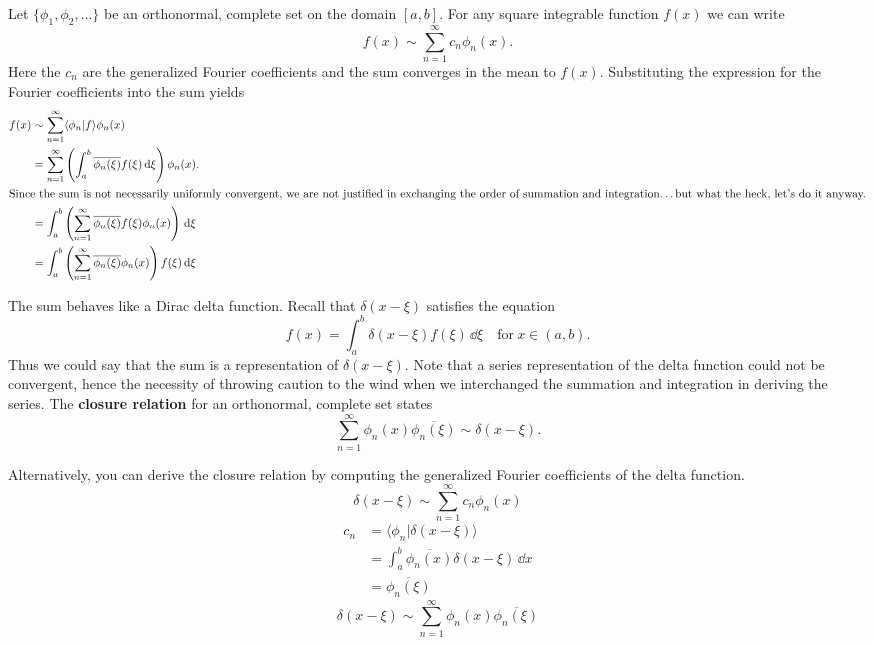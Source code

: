 Let $\{ \phi_1, \phi_2, \ldots \}$ be an orthonormal, complete set on the
domain $[a,b]$.  For any
square integrable function $f(x)$ we can write
\[ f(x) \sim \sum_{n = 1}^\infty c_n \phi_n(x).\]
Here the $c_n$ are the generalized Fourier coefficients and the sum converges
in the mean to $f(x)$.  Substituting the expression for the Fourier
coefficients into the sum yields
\begin{align*}
  f(x) &\sim \sum_{n = 1}^\infty \langle \phi_n | f \rangle \phi_n(x) \\
  &= \sum_{n = 1}^\infty \left( \int_a^b \overline{\phi_n(\xi)} f(\xi)\,\mathrm{d} \xi 
  \right) \phi_n(x). \\
  \intertext{Since the sum is not necessarily uniformly convergent, we are
    not justified in exchanging the order of summation and integration\ldots but
    what the heck, let's do it anyway.}
  &= \int_a^b \left(\sum_{n = 1}^\infty \overline{\phi_n(\xi)} f(\xi) \phi_n(x) 
  \right)\,\mathrm{d} \xi \\
  &= \int_a^b \left(\sum_{n = 1}^\infty \overline{\phi_n(\xi)} \phi_n(x) \right)
  f(\xi)\,\mathrm{d} \xi
\end{align*}

The sum behaves like a Dirac delta function.  
Recall that $\delta(x-\xi)$ satisfies the equation
\[ f(x) = \int_a^b \delta(x-\xi) f(\xi)\,\dd \xi \quad \mathrm{for}\ 
x \in (a,b). \]
Thus we could say that the sum is a representation of $\delta(x-\xi)$. 
Note that a series representation of the delta function could not be 
convergent, hence the necessity of throwing caution to the wind when we
interchanged the summation and integration in deriving the series.
The \textbf{closure relation} for an orthonormal, complete set states
\[ \sum_{n = 1}^\infty \phi_n(x) \overline{\phi_n(\xi)} \sim \delta(x-\xi). \]







Alternatively, you can derive the closure relation by computing the generalized 
Fourier coefficients of the delta function.
\[ \delta(x-\xi) \sim \sum_{n = 1}^\infty c_n \phi_n(x) \]
\begin{align*}
  c_n     &= \langle \phi_n | \delta(x-\xi) \rangle \\
  &= \int_a^b \overline{\phi_n(x)} \delta(x-\xi)\,\dd x \\
  &= \overline{\phi_n(\xi)}
\end{align*}
\[ \delta(x-\xi) \sim \sum_{n = 1}^\infty \phi_n(x) \overline{\phi_n(\xi)} \]





